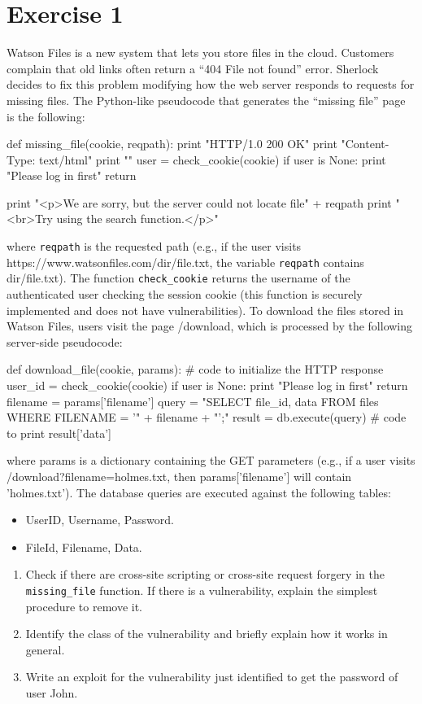 \section{Exercise 1}

Watson Files is a new system that lets you store files in the cloud. 
Customers complain that old links often return a “404 File not found” error. 
Sherlock decides to fix this problem modifying how the web server responds to requests for missing files. 
The Python-like pseudocode that generates the “missing file” page is the following:
\begin{verbnobox}[\verbarg]
def missing_file(cookie, reqpath):
print "HTTP/1.0 200 OK"
    print "Content-Type: text/html"
    print ""
    user = check_cookie(cookie)
    if user is None:
        print "Please log in first"
        return

    print "<p>We are sorry, but the server could not locate file" + reqpath
    print "<br>Try using the search function.</p>"
\end{verbnobox}
where \texttt{reqpath} is the requested path (e.g., if the user visits https://www.watsonfiles.com/dir/file.txt, the variable \texttt{reqpath} contains dir/file.txt). 
The function \texttt{check\_cookie} returns the username of the authenticated user checking the session cookie (this function is securely implemented and does not have vulnerabilities).
To download the files stored in Watson Files, users visit the page /download, which is processed by the following server-side pseudocode:
\begin{verbnobox}[\verbarg]
def download_file(cookie, params):
    # code to initialize the HTTP response
    user_id = check_cookie(cookie)
    if user is None:
        print "Please log in first"
        return
    filename = params['filename']
    query = "SELECT file_id, data FROM files WHERE FILENAME = '" + filename + "';"
    result = db.execute(query)
    # code to print result['data']
\end{verbnobox}
where params is a dictionary containing the GET parameters (e.g., if a user visits /download?filename=holmes.txt, then params['filename'] will contain 'holmes.txt').
The database queries are executed against the following tables:
\begin{itemize}
    \item UserID, Username, Password. 
    \item FileId, Filename, Data.
\end{itemize}
\begin{enumerate}
    \item Check if there are cross-site scripting or cross-site request forgery in the \texttt{missing\_file} function. 
        If there is a vulnerability, explain the simplest procedure to remove it. 
    \item Identify the class of the vulnerability and briefly explain how it works in general.
    \item Write an exploit for the vulnerability just identified to get the password of user John.
\end{enumerate}

